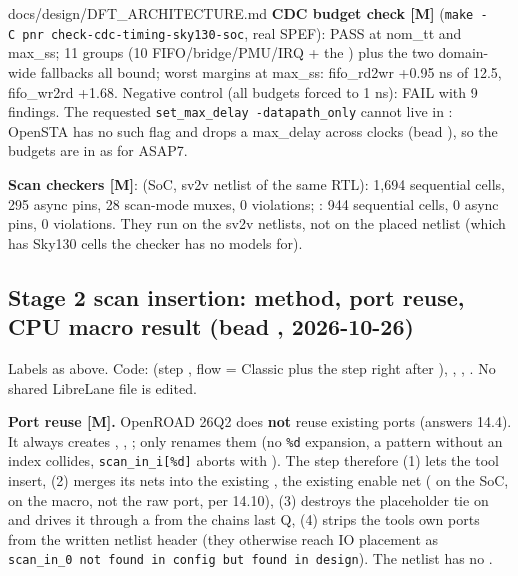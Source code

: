 \begin{relocated}{docs/design/DFT_ARCHITECTURE.md}
\textbf{CDC budget check {[}M{]}}
(\texttt{make\ -\allowbreak{}C\ pnr\ check-\allowbreak{}cdc-\allowbreak{}timing-\allowbreak{}sky130-\allowbreak{}soc},
real SPEF): PASS at nom\_tt and max\_ss; 11 groups (10
FIFO/\allowbreak{}bridge/\allowbreak{}PMU/\allowbreak{}IRQ + the
) plus the two domain-wide fallbacks all
bound; worst margins at max\_ss: fifo\_\allowbreak{}rd2wr +0.95 ns of
12.5, fifo\_\allowbreak{}wr2rd +1.68. Negative control (all budgets
forced to 1 ns): FAIL with 9 findings. The requested
\texttt{set\_\allowbreak{}max\_\allowbreak{}delay\ -\allowbreak{}datapath\_\allowbreak{}only}
cannot live in : OpenSTA has no such flag and drops
a max\_delay across  clocks (bead ), so the
budgets are in  as for ASAP7.

\textbf{Scan checkers {[}M{]}}:  (SoC, sv2v netlist
of the same RTL): 1,694 sequential cells, 295 async pins, 28 scan-mode
muxes, 0 violations; : 944 sequential
cells, 0 async pins, 0 violations. They run on the sv2v netlists, not on
the placed netlist (which has Sky130 cells the checker has no models
for).

\subsection{\texorpdfstring{Stage 2 scan insertion: method, port
reuse, CPU macro result (bead ,
2026-10-26)}{Stage 2 scan insertion: method, port reuse, CPU macro result (bead , 2026-10-26)}}\label{tm:ch:dft-architecture:1412-stage-2-scan-insertion-method-port-reuse-cpu-macro-result-bead-j41m8-2026-10-26}

Labels as above. Code: 
(step , flow  = Classic plus
the step right after ),
, ,
. No shared LibreLane file is
edited.

\textbf{Port reuse {[}M{]}.} OpenROAD 26Q2  does
\textbf{not} reuse existing ports (answers 14.4). It always creates
, , ;
 only renames them (no \texttt{\%d}
expansion, a pattern without an index collides,
\texttt{scan\_\allowbreak{}in\_\allowbreak{}i[\%d]} aborts with
). The step therefore (1) lets the tool insert, (2) merges
its nets into the existing , the existing enable net
( on the SoC,  on the macro, not the
raw  port, per 14.10), (3) destroys the 
placeholder tie on  and drives it through a
 from the chain\textquotesingle s last Q, (4) strips the
tool\textquotesingle s own ports from the written netlist header (they
otherwise reach IO placement as
\texttt{scan\_\allowbreak{}in\_\allowbreak{}0\ not\ found\ in\ config\ but\ found\ in\ design}).
The netlist has no .


\end{relocated}
